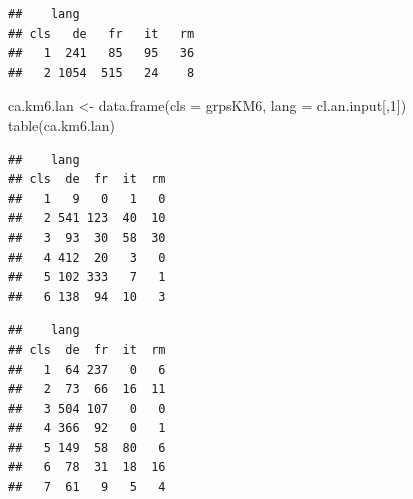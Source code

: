 \documentclass[
]{article}
\newenvironment{Shaded}{\begin{snugshade}}{\end{snugshade}}
\newcommand{\AttributeTok}[1]{\textcolor[rgb]{0.77,0.63,0.00}{#1}}
\newcommand{\DecValTok}[1]{\textcolor[rgb]{0.00,0.00,0.81}{#1}}
\newcommand{\FunctionTok}[1]{\textcolor[rgb]{0.00,0.00,0.00}{#1}}
\newcommand{\NormalTok}[1]{#1}
\newcommand{\OtherTok}[1]{\textcolor[rgb]{0.56,0.35,0.01}{#1}}
\newcommand{\SpecialCharTok}[1]{\textcolor[rgb]{0.00,0.00,0.00}{#1}}
\begin{document}
\begin{verbatim}
##    lang
## cls   de   fr   it   rm
##   1  241   85   95   36
##   2 1054  515   24    8
\end{verbatim}

\begin{Shaded}
\begin{Highlighting}[]
\NormalTok{ca.km6.lan }\OtherTok{\textless{}{-}} \FunctionTok{data.frame}\NormalTok{(}\AttributeTok{cls =}\NormalTok{ grpsKM6, }\AttributeTok{lang =}\NormalTok{ cl.an.input[,}\DecValTok{1}\NormalTok{])}
\FunctionTok{table}\NormalTok{(ca.km6.lan)}
\end{Highlighting}
\end{Shaded}

\begin{verbatim}
##    lang
## cls  de  fr  it  rm
##   1   9   0   1   0
##   2 541 123  40  10
##   3  93  30  58  30
##   4 412  20   3   0
##   5 102 333   7   1
##   6 138  94  10   3
\end{verbatim}

\begin{Shaded}
\end{Shaded}

\begin{verbatim}
##    lang
## cls  de  fr  it  rm
##   1  64 237   0   6
##   2  73  66  16  11
##   3 504 107   0   0
##   4 366  92   0   1
##   5 149  58  80   6
##   6  78  31  18  16
##   7  61   9   5   4
\end{verbatim}
\end{document}
